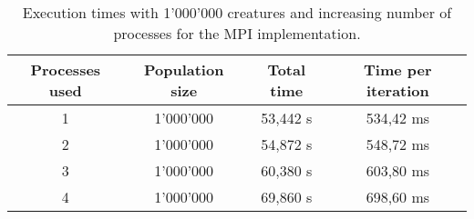 \documentclass[12pt,a4paper,oneside]{article}
\begin{document}
	\begin{table}[!ht]
		\centering
		\begin{tabular}{|c|c|c|c|}
		\hline
		Processes used & Population size & Total time & Time per iteration \\ \hline
		1                   & 1'000'000           & 53,442 s           & 534,42 ms                   \\ \hline
		2                   & 1'000'000           & 54,872 s           & 548,72 ms                   \\ \hline
		3                   & 1'000'000           & 60,380 s           & 603,80 ms                   \\ \hline
		4                   & 1'000'000           & 69,860 s           & 698,60 ms                   \\ \hline
		\end{tabular}
		\caption{Execution times with 1'000'000 creatures and increasing number of processes for the MPI implementation.}
		\label{table:mpi_1m}
	\end{table}
\end{document}
